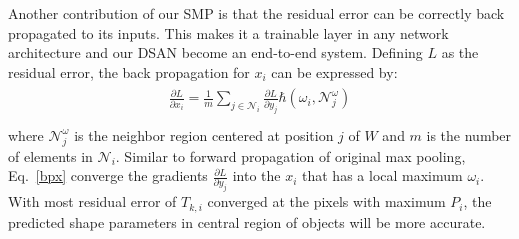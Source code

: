 Another contribution of our SMP is that the residual error can be correctly back propagated to its inputs.
This makes it a trainable layer in any network architecture and our DSAN become an end-to-end system.
Defining $L$ as the residual error, the back propagation for $x_{i}$ can be expressed by:
\begin{eqnarray}\label{bpx}
\begin{aligned}
\frac{\partial L}{\partial x_{i}}=\frac{1}{m}\sum\limits_{j\in\mathcal{N}_{i}}\frac{\partial L}{\partial y_{j}}\hbar(\omega_{i},{\mathcal{N}}^{\omega}_{j})\\
\end{aligned}
\end{eqnarray}
where $\mathcal{N}^{\omega}_{j}$ is the neighbor region centered at position $j$ of $W$ and $m$ is the number of elements in $\mathcal{N}_{i}$.
Similar to forward propagation of original max pooling, Eq.~\ref{bpx} converge the gradients $\frac{\partial L}{\partial y_{j}}$ into the $x_{i}$ that has a local maximum $\omega_{i}$.
With most residual error of $T_{k,i}$ converged at the pixels with maximum $P_i$, the predicted shape parameters in central region of objects will be more accurate.


